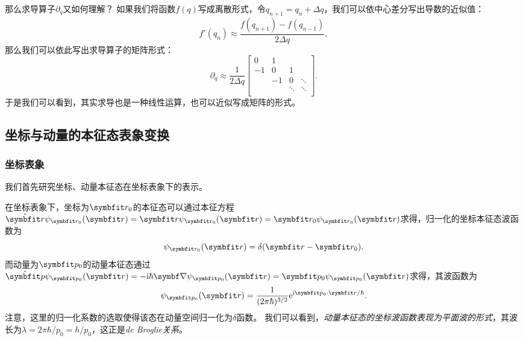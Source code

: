 \begin{tcolorbox}[breakable, colframe=purple, colback=red!10, title={\textbf{关于连续力学量的算符}}]
那么求导算子$\partial_q$又如何理解？
如果我们将函数$f(q)$写成离散形式，令$q_{n+1} = q_n + \Delta q$，我们可以依中心差分写出导数的近似值：
\begin{equation}
    f'(q_n) \approx \frac{f(q_{n+1})-f(q_{n-1})}{2\Delta q},
\end{equation}
那么我们可以依此写出求导算子的矩阵形式：
\begin{equation}
    \partial_q \approx \frac{1}{2\Delta q}
    \begin{bmatrix}
        0  &  1 \\
        -1 &  0 &  1    \\
           & -1 &  0    &\ddots \\
           &    &\ddots &\ddots \\
    \end{bmatrix}.
\end{equation}
于是我们可以看到，其实求导也是一种线性运算，也可以近似写成矩阵的形式。
\end{tcolorbox}


\subsection{\texorpdfstring{坐标与动量的本征态\quad 表象变换}{坐标与动量的本征态  表象变换}}
\label{subsec:cmr_eigen_rep_trans}

\subsubsection{坐标表象}

我们首先研究坐标、动量本征态在坐标表象下的表示。

\begin{tcolorbox}
在坐标表象下，坐标为$\rr_0$的本征态可以通过本征方程$\hat{\rr}\psi_{\rr_0}(\rr) = \rr\psi_{\rr_0}(\rr) = \rr_0 \psi_{\rr_0}(\rr)$求得，归一化的坐标本征态波函数为
\begin{equation}
    \psi_{\rr_0}(\rr) = \delta(\rr-\rr_0).
\end{equation}
而动量为$\pp_0$的动量本征态通过$\hat{\pp}\psi_{\pp_0}(\rr) = -\ii\hbar\del\psi_{\pp_0}(\rr) = \pp_0 \psi_{\pp_0}(\rr)$求得，其波函数为
\begin{equation}
    \psi_{\pp_0}(\rr) = \frac{1}{(2\pi\hbar)^{3/2}} \ee^{\ii\pp_0\cdot\rr/\hbar}.
\end{equation}
注意，这里的归一化系数的选取使得该态在动量空间归一化为$\delta$函数。
我们可以看到，\emph{动量本征态的坐标波函数表现为平面波的形式}，其波长为$\lambda=2\pi\hbar/p_0=h/p_0$，这正是\emph{de Broglie关系}。
\end{tcolorbox}

